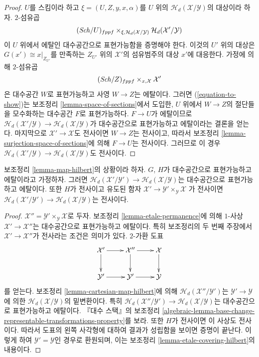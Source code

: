 \begin{proof}
$U$를 스킴이라 하고 $\xi = (U, Z, y, x, \alpha)$를 $U$ 위의
$\mathcal{H}_d(\mathcal{X}/\mathcal{Y})$의 대상이라 하자.
$2$-섬유곱
\begin{equation}
\label{equation-to-show}
(\mathit{Sch}/U)_{fppf}
\times_{\xi, \mathcal{H}_d(\mathcal{X}/\mathcal{Y})}
\mathcal{H}_d(\mathcal{X}'/\mathcal{Y})
\end{equation}
이 $U$ 위에서 에탈인 대수공간으로 표현가능함을 증명해야 한다.
이것의 $U'$ 위의 대상은 $G(x') \cong x|_{Z_{U'}}$를 만족하는
$Z_{U'}$ 위의 $\mathcal{X}'$의 섬유범주의 대상 $x'$에 대응한다.
가정에 의해 $2$-섬유곱
$$
(\mathit{Sch}/Z)_{fppf} \times_{x, \mathcal{X}} \mathcal{X}'
$$
은 대수공간 $W$로 표현가능하고 사영 $W \to Z$는 에탈이다.
그러면 (\ref{equation-to-show})는 보조정리
\ref{lemma-space-of-sections}에서 도입한, $U$ 위에서 $W \to Z$의
절단들을 모수화하는 대수공간 $F$로 표현가능하다.
$F \to U$가 에탈이므로
$\mathcal{H}_d(\mathcal{X}'/\mathcal{Y}) \to
\mathcal{H}_d(\mathcal{X}/\mathcal{Y})$가 대수공간으로 표현가능하고
에탈이라는 결론을 얻는다. 마지막으로
$\mathcal{X}' \to \mathcal{X}$도 전사이면 $W \to Z$는 전사이고,
따라서 보조정리 \ref{lemma-surjection-space-of-sections}에 의해
$F \to U$는 전사이다. 그러므로 이 경우
$\mathcal{H}_d(\mathcal{X}'/\mathcal{Y}) \to
\mathcal{H}_d(\mathcal{X}/\mathcal{Y})$도 전사이다.
\end{proof}

\begin{lemma}
\label{lemma-etale-map-hilbert}
보조정리 \ref{lemma-map-hilbert}의 상황이라 하자.
$G$, $H$가 대수공간으로 표현가능하고 에탈이라고 가정하자.
그러면 $\mathcal{H}_d(\mathcal{X}'/\mathcal{Y}') \to
\mathcal{H}_d(\mathcal{X}/\mathcal{Y})$는 대수공간으로 표현가능하고
에탈이다. 또한 $H$가 전사이고 유도된 함자
$\mathcal{X}' \to \mathcal{Y}' \times_\mathcal{Y} \mathcal{X}$
가 전사이면
$\mathcal{H}_d(\mathcal{X}'/\mathcal{Y}') \to
\mathcal{H}_d(\mathcal{X}/\mathcal{Y})$는 전사이다.
\end{lemma}

\begin{proof}
$\mathcal{X}'' = \mathcal{Y}' \times_\mathcal{Y} \mathcal{X}$로 두자.
보조정리 \ref{lemma-etale-permanence}에 의해 $1$-사상
$\mathcal{X}' \to \mathcal{X}''$는 대수공간으로 표현가능하고 에탈이다.
특히 보조정리의 두 번째 주장에서
$\mathcal{X}' \to \mathcal{X}''$가 전사라는 조건은 의미가 있다.
$2$-가환 도표
$$
\xymatrix{
\mathcal{X}' \ar[r] \ar[d] &
\mathcal{X}'' \ar[r] \ar[d] &
\mathcal{X} \ar[d] \\
\mathcal{Y}' \ar[r] &
\mathcal{Y}' \ar[r] &
\mathcal{Y}
}
$$
를 얻는다. 보조정리 \ref{lemma-cartesian-map-hilbert}에 의해
$\mathcal{H}_d(\mathcal{X}''/\mathcal{Y}')$는
$\mathcal{Y}' \to \mathcal{Y}$에 의한
$\mathcal{H}_d(\mathcal{X}/\mathcal{Y})$의 밑변환이다. 특히
$\mathcal{H}_d(\mathcal{X}''/\mathcal{Y}') \to
\mathcal{H}_d(\mathcal{X}/\mathcal{Y})$는 대수공간으로 표현가능하고
에탈이다. 『대수 스택』의 보조정리
\ref{algebraic-lemma-base-change-representable-transformations-property}를
보라. 또한 $H$가 전사이면 이 사상도 전사이다. 따라서 도표의 왼쪽
사각형에 대하여 결과가 성립함을 보이면 증명이 끝난다.
이렇게 하여 $\mathcal{Y}' = \mathcal{Y}$인 경우로 환원되며,
이는 보조정리 \ref{lemma-etale-covering-hilbert}의 내용이다.
\end{proof}


